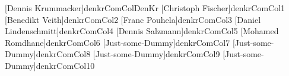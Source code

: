 [Dennis Krummacker]{denkrComColDenKr}%
%
[Christoph Fischer]{denkrComCol1}%
%
[Benedikt Veith]{denkrComCol2}%
%
[Franc Pouhela]{denkrComCol3}%
%
[Daniel Lindenschmitt]{denkrComCol4}%
%
[Dennis Salzmann]{denkrComCol5}%
%
[Mohamed Romdhane]{denkrComCol6}%
%
[Just-some-Dummy]{denkrComCol7}%
%
[Just-some-Dummy]{denkrComCol8}%
%
[Just-some-Dummy]{denkrComCol9}%
%
[Just-some-Dummy]{denkrComCol10}%
%
%
%
%
%
%
%
